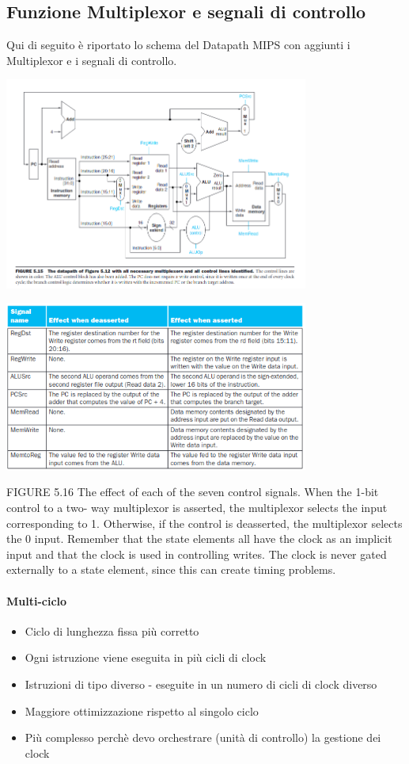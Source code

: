 \documentclass[12pt, a4paper, openany]{book}
\begin{document}
\subsection*{Funzione Multiplexor e segnali di controllo}
Qui di seguito è riportato lo schema del Datapath MIPS con aggiunti i Multiplexor e i
segnali di controllo.
\begin{center}
    \includegraphics[width=100mm, scale=0.5]{ALU control signal scheme.png}
\end{center}
\begin{center}
    \includegraphics[width=100mm, scale=0.5]{Multiplexor ALU signal control.png}
\end{center}
FIGURE 5.16 The effect of each of the seven control signals. When the 1-bit control to a two-
way multiplexor is asserted, the multiplexor selects the input corresponding to 1. Otherwise, if the control is
deasserted, the multiplexor selects the 0 input. Remember that the state elements all have the clock as an
implicit input and that the clock is used in controlling writes. The clock is never gated externally to a state
element, since this can create timing problems.


\paragraph*{Multi-ciclo} \begin{itemize}
    \item Ciclo di lunghezza fissa più corretto
    \item Ogni istruzione viene eseguita in più cicli di clock
    \item Istruzioni di tipo diverso - eseguite in un numero di cicli di clock diverso
    \item Maggiore ottimizzazione rispetto al singolo ciclo
    \item Più complesso perchè devo orchestrare (unità di controllo) la gestione dei clock
\end{itemize}
\end{document}
